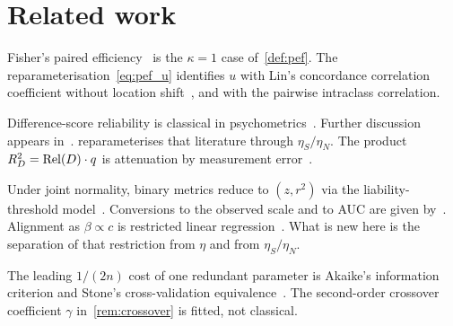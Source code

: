 \section{Related work}
\label{sec:related}

Fisher's paired efficiency~\parencite{fisher1935} is the $\kappa=1$ case of~\cref{def:pef}.
The reparameterisation~\cref{eq:pef_u} identifies $u$ with Lin's concordance correlation coefficient without location shift~\parencite{lin1989}, and with the pairwise intraclass correlation.

Difference-score reliability is classical in psychometrics~\parencite{lord1956,lord1963,cronbachFurby1970,rogosaWillett1983}.
Further discussion appears in~\parencite{zimmermanWilliams1982,zimmermanWilliams1998}.
 reparameterises that literature through $\eta_S/\eta_N$.
The product $R^2_D=\operatorname{Rel}(D)\cdot q$ is attenuation by measurement error~\parencite{fuller1987}.

Under joint normality, binary metrics reduce to $(z,r^2)$ via the liability-threshold model~\parencite{falconer1965}.
Conversions to the observed scale and to AUC are given by~\parencite{wray2010,lee2012}.
Alignment as $\beta\propto c$ is restricted linear regression~\parencite{seberLee2003}.
What is new here is the separation of that restriction from $\eta$ and from $\eta_S/\eta_N$.

The leading $1/(2n)$ cost of one redundant parameter is Akaike's information criterion and Stone's cross-validation equivalence~\parencite{akaike1973,stone1977}.
The second-order crossover coefficient $\gamma$ in~\cref{rem:crossover} is fitted, not classical.

